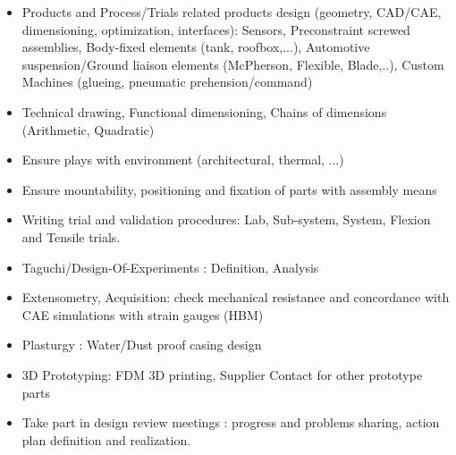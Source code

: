 \documentclass[]{friggeri-cv}
\begin{document}
\begin{itemize}
\setlength{\itemsep}{1pt}
\setlength{\parskip}{0pt}
\setlength{\parsep}{0pt}

\item Products and Process/Trials related products design (geometry, CAD/CAE, dimensioning, optimization, interfaces): Sensors, Preconstraint screwed assemblies, Body-fixed elements (tank, roofbox,...), Automotive suspension/Ground liaison elements (McPherson, Flexible, Blade,..), Custom Machines (glueing, pneumatic prehension/command)
\item Technical drawing, Functional dimensioning, Chains of dimensions (Arithmetic, Quadratic)
\item Ensure plays with environment (architectural, thermal, ...)
\item Ensure mountability, positioning and fixation of parts with assembly means
\item Writing trial and validation procedures: Lab, Sub-system, System, Flexion and Tensile trials.
\item Taguchi/Design-Of-Experiments : Definition, Analysis
\item Extensometry, Acquisition: check mechanical resistance and concordance with CAE simulations with strain gauges (HBM)
\item Plasturgy : Water/Dust proof casing design
\item 3D Prototyping: FDM 3D printing, Supplier Contact for other prototype parts
\item Take part in design review meetings : progress and problems sharing, action plan definition and realization.
\end{itemize}
\end{document}
